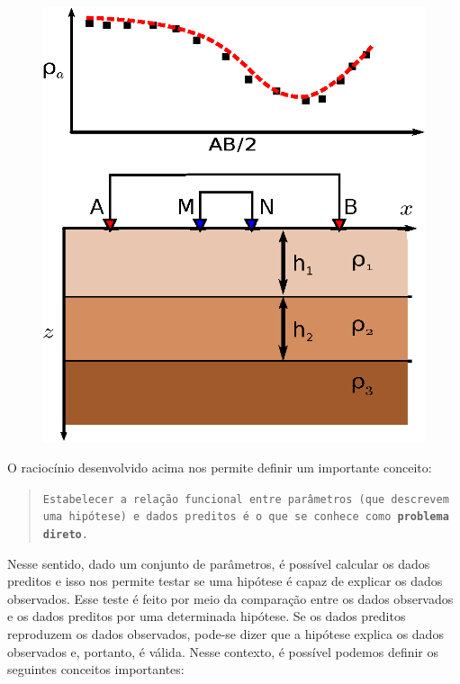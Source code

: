 \begin{figure}
    \centering
    \includegraphics[scale=1]{../figs/params-sev.eps}
    \caption{}
    \label{params-sev}
\end{figure}

\indent O raciocínio desenvolvido acima nos permite definir um importante conceito:

\begin{quotation}
{\tt Estabelecer a relação funcional entre parâmetros (que des\-cre\-vem uma hipótese)
e dados preditos é o que se co\-nhe\-ce como {\bf pro\-ble\-ma direto}.}
\end{quotation}

\indent Nesse sentido, dado um conjunto de parâmetros, é possível calcular os dados
preditos e isso nos permite testar se uma hipótese é capaz de explicar os dados
observados. Esse teste é feito por meio da comparação entre os dados observados
e os dados preditos por uma determinada hipótese. Se os dados preditos
reproduzem os dados observados, pode-se dizer que a hipótese explica os dados
observados e, portanto, é válida. Nesse contexto, é possível podemos definir os
seguintes conceitos importantes:

